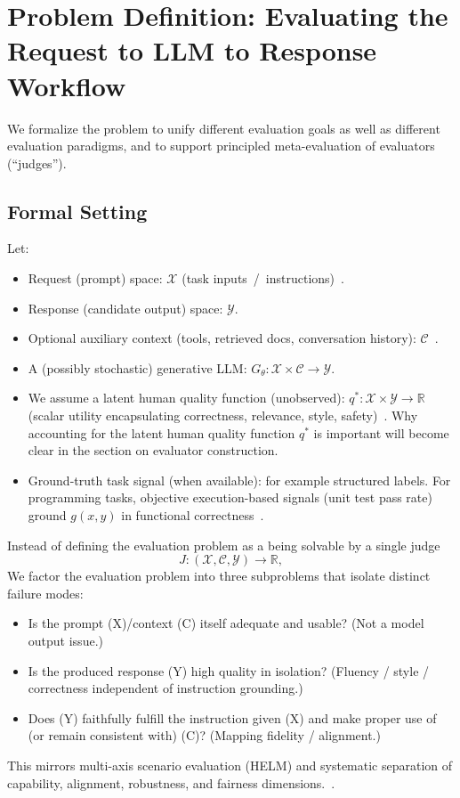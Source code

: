 \section{Problem Definition: Evaluating the Request to LLM to Response Workflow}

We formalize the problem to unify different evaluation goals as well as different evaluation paradigms, and to support principled meta-evaluation of evaluators (``judges'').

\subsection{Formal Setting}
Let:
\begin{itemize}
	\item Request (prompt) space: $\mathcal{X}$ (task inputs~/~instructions)~\cite{srivastava2022bigbench, liang2022helm}.
	\item Response (candidate output) space: $\mathcal{Y}$.
	\item Optional auxiliary context (tools, retrieved docs, conversation history): $\mathcal{C}$~\cite{liang2022helm}.
	\item A (possibly stochastic) generative LLM\@: $G_{\theta}: \mathcal{X} \times \mathcal{C} \to \mathcal{Y}$.
	\item We assume a latent human quality function (unobserved): $q^{*}: \mathcal{X} \times \mathcal{Y} \to \mathbb{R}$ (scalar utility encapsulating correctness, relevance, style, safety)~\cite{stiennon2020learning, ouyang2022training}. Why accounting for the latent human quality function $q^{*}$ is important will become clear in the section on evaluator construction.
	\item Ground-truth task signal (when available): for example structured labels. For programming tasks, objective execution-based signals (unit test pass rate) ground $g(x,y)$ in functional correctness~\cite{chen2021evaluating}.
\end{itemize}

Instead of defining the evaluation problem as a being solvable by a single judge
\begin{equation}
	J: (\mathcal{X},\mathcal{C},\mathcal{Y}) \to \mathbb{R},
\end{equation}  
We factor the evaluation problem into three subproblems that isolate distinct failure modes:

\begin{itemize}
    \item Is the prompt (X)/context (C) itself adequate and usable? (Not a model output issue.)
    \item Is the produced response (Y) high quality in isolation? (Fluency / style / correctness independent of instruction grounding.)
    \item Does (Y) faithfully fulfill the instruction given (X) and make proper use of (or remain consistent with) (C)? (Mapping fidelity / alignment.)
\end{itemize}
This mirrors multi-axis scenario evaluation (HELM) and systematic separation of capability, alignment, robustness, and fairness dimensions.~\cite{liang2022helm, srivastava2022bigbench}.

